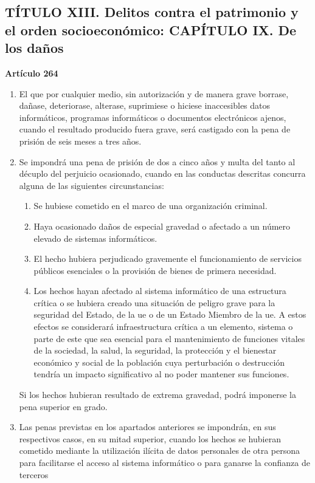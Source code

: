 \subsection{TÍTULO XIII. Delitos contra el patrimonio y el orden socioeconómico: CAPÍTULO IX. De los daños}

\textbf{Artículo 264}
\begin{enumerate}[label=\textbf{\arabic*.}]
    \item El que por cualquier medio, sin autorización y de manera grave borrase, dañase, deteriorase, alterase, suprimiese o hiciese inaccesibles datos informáticos, programas informáticos o documentos electrónicos ajenos, cuando el resultado producido fuera grave, será castigado con la pena de prisión de seis meses a tres años.
    \item Se impondrá una pena de prisión de dos a cinco años y multa del tanto al décuplo del perjuicio ocasionado, cuando en las conductas descritas concurra alguna de las siguientes circunstancias:
          \begin{enumerate}[label=\arabic*.a]
              \item Se hubiese cometido en el marco de una organización criminal.
              \item Haya ocasionado daños de especial gravedad o afectado a un número elevado de sistemas informáticos.
              \item El hecho hubiera perjudicado gravemente el funcionamiento de servicios públicos esenciales o la provisión de bienes de primera necesidad.
              \item Los hechos hayan afectado al  sistema informático de una estructura crítica o se hubiera creado una situación de peligro grave para la seguridad del Estado, de la \gls{ue} o de un Estado Miembro de la \gls{ue}. A estos efectos se considerará infraestructura crítica a un elemento, sistema o parte de este que sea esencial para el mantenimiento de funciones vitales de la sociedad, la salud, la seguridad, la protección y el bienestar económico y social de la población cuya perturbación o destrucción tendría un impacto significativo al no poder mantener sus funciones.
          \end{enumerate}
          Si los hechos hubieran resultado de extrema gravedad, podrá imponerse la pena superior en grado.
    \item Las penas previstas en los apartados anteriores se impondrán, en sus respectivos casos, en su mitad superior, cuando los hechos se hubieran cometido mediante la utilización ilícita de datos personales de otra persona para facilitarse el acceso al sistema informático o para ganarse la confianza de terceros
\end{enumerate}

